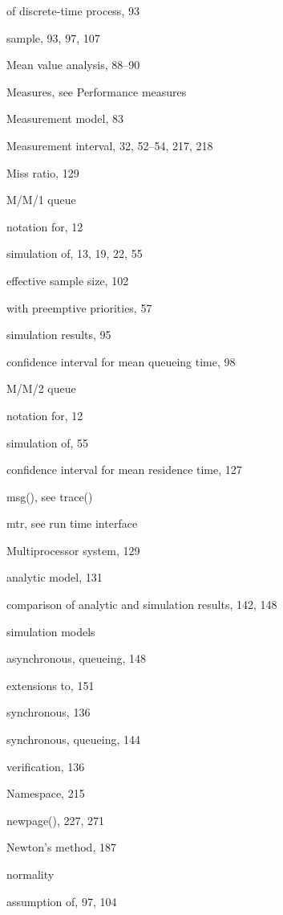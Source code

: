 \quad of discrete-time process, 93\par
\quad sample, 93, 97, 107\par
\noindent Mean value analysis, 88--90\par
\noindent Measures, see Performance measures\par
\noindent Measurement model, 83\par
\noindent Measurement interval, 32, 52--54, 217, 218\par
\noindent Miss ratio, 129\par
\noindent M/M/1 queue\par
\quad notation for, 12\par
\quad simulation of, 13, 19, 22, 55\par
\qquad effective sample size, 102\par
\qquad with preemptive priorities, 57\par
\quad simulation results, 95\par
\qquad confidence interval for mean queueing time, 98\par
\noindent M/M/2 queue\par
\quad notation for, 12\par
\quad simulation of, 55\par
\qquad confidence interval for mean residence time, 127\par
\noindent msg(), see trace()\par
\noindent mtr, see run time interface\par
\noindent Multiprocessor system, 129\par
\quad analytic model, 131\par
\quad comparison of analytic and simulation results, 142, 148\par
\quad simulation models\par
\qquad asynchronous, queueing, 148\par
\qquad extensions to, 151\par
\qquad synchronous, 136\par
\qquad synchronous, queueing, 144\par
\quad verification, 136\par
\noindent Namespace, 215\par
\noindent newpage(), 227, 271\par
\noindent Newton's method, 187\par
\noindent normality\par
\quad assumption of, 97, 104\par
